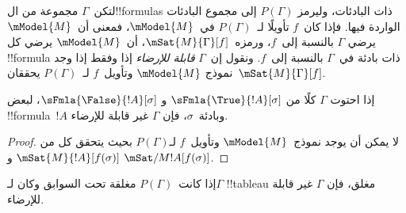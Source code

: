 \documentclass[../../../include/open-logic-section]{subfiles}
\begin{document}
\begin{defn}
  لتكن~$\Gamma$ مجموعة من ال!!{formula}s ذات البادئات، وليرمز
  $P(\Gamma)$ إلى مجموع البادئات الواردة فيها. فإذا كان~$f$ تأويلًا
  لـ~$P(\Gamma)$ في~$\mModel{M}$، فمعنى أن~$\mModel{M}$ يرضي
  $\Gamma$ بالنسبة إلى~$f$، ورمزه~$\mSat{M}{\Gamma}[f]$، أن~$\mModel{M}$
  يرضي كل !!{formula} ذات بادئة في~$\Gamma$ بالنسبة إلى~$f$.
  ونقول إن~$\Gamma$ \emph{قابلة للإرضاء} إذا وفقط إذا وجد نموذج
  $\mModel{M}$ وتأويل~$f$ لـ~$P(\Gamma)$ يحققان~$\mSat{M}{\Gamma}[f]$.
\end{defn}

\begin{prop}
  إذا احتوت $\Gamma$ كلًا من $\sFmla{\True}{!A}[\sigma]$ و
  $\sFmla{\False}{!A}[\sigma]$، لبعض !!{formula}~$!A$ وبادئة~$\sigma$،
  فإن $\Gamma$ غير قابلة للإرضاء.
\end{prop}

\begin{proof}
  لا يمكن أن يوجد نموذج~$\mModel{M}$ وتأويل~$f$ لـ$P(\Gamma)$ بحيث
  يتحقق كل من $\mSat{M}{!A}[f(\sigma)]$ و
  $\mSat/{M}{!A}[f(\sigma)]$.
\end{proof}

\begin{thm}[السلامة]
  إذا كانت~$P(\Gamma)$ مغلقة تحت السوابق وكان لـ$\Gamma$ !!{tableau}
  مغلق، فإن $\Gamma$ غير قابلة للإرضاء.
\end{thm}
\end{document}
